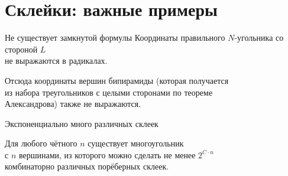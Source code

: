 \section{Склейки: важные примеры}

\begin{frame}{Не существует замкнутой формулы}
	Координаты правильного \(N\)-угольника со стороной \(L\) \\
	не выражаются в радикалах. \vspace{-3mm}

	\begin{center}  \end{center} \vspace{-4mm}

	Отсюда координаты вершин бипирамиды (которая получается\\
	из набора треугольников с целыми сторонами по теореме\\
	Александрова) также не выражаются.
\end{frame}

\begin{frame}{Экспоненциально много различных склеек} \ \\ [-0.2cm]
   \begin{thm}
	Для любого чётного \(n\) существует многоугольник\\
	с \(n\) вершинами, из которого можно сделать не менее \(2^{C \cdot n}\)\\
	комбинаторно различных \alert{порёберных} склеек.
   \end{thm}
   \begin{center}  \end{center}
\end{frame}
